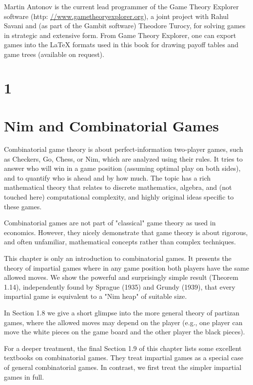 \documentclass[12pt]{article}
\begin{document}
Martin Antonov is the current lead programmer of the Game Theory Explorer software (http: \href{//www.gametheoryexplorer.org}{//www.gametheoryexplorer.org}), a joint project with Rahul Savani and (as part of the Gambit software) Theodore Turocy, for solving games in strategic and extensive form. From Game Theory Explorer, one can export games into the LaTeX formats used in this book for drawing payoff tables and game trees (available on request).

\section*{1}
\section*{Nim and Combinatorial Games}
Combinatorial game theory is about perfect-information two-player games, such as Checkers, Go, Chess, or Nim, which are analyzed using their rules. It tries to answer who will win in a game position (assuming optimal play on both sides), and to quantify who is ahead and by how much. The topic has a rich mathematical theory that relates to discrete mathematics, algebra, and (not touched here) computational complexity, and highly original ideas specific to these games.

Combinatorial games are not part of "classical" game theory as used in economics. However, they nicely demonstrate that game theory is about rigorous, and often unfamiliar, mathematical concepts rather than complex techniques.

This chapter is only an introduction to combinatorial games. It presents the theory of impartial games where in any game position both players have the same allowed moves. We show the powerful and surprisingly simple result (Theorem 1.14), independently found by Sprague (1935) and Grundy (1939), that every impartial game is equivalent to a "Nim heap" of suitable size.

In Section 1.8 we give a short glimpse into the more general theory of partizan games, where the allowed moves may depend on the player (e.g., one player can move the white pieces on the game board and the other player the black pieces).

For a deeper treatment, the final Section 1.9 of this chapter lists some excellent textbooks on combinatorial games. They treat impartial games as a special case of general combinatorial games. In contrast, we first treat the simpler impartial games in full.
\end{document}
